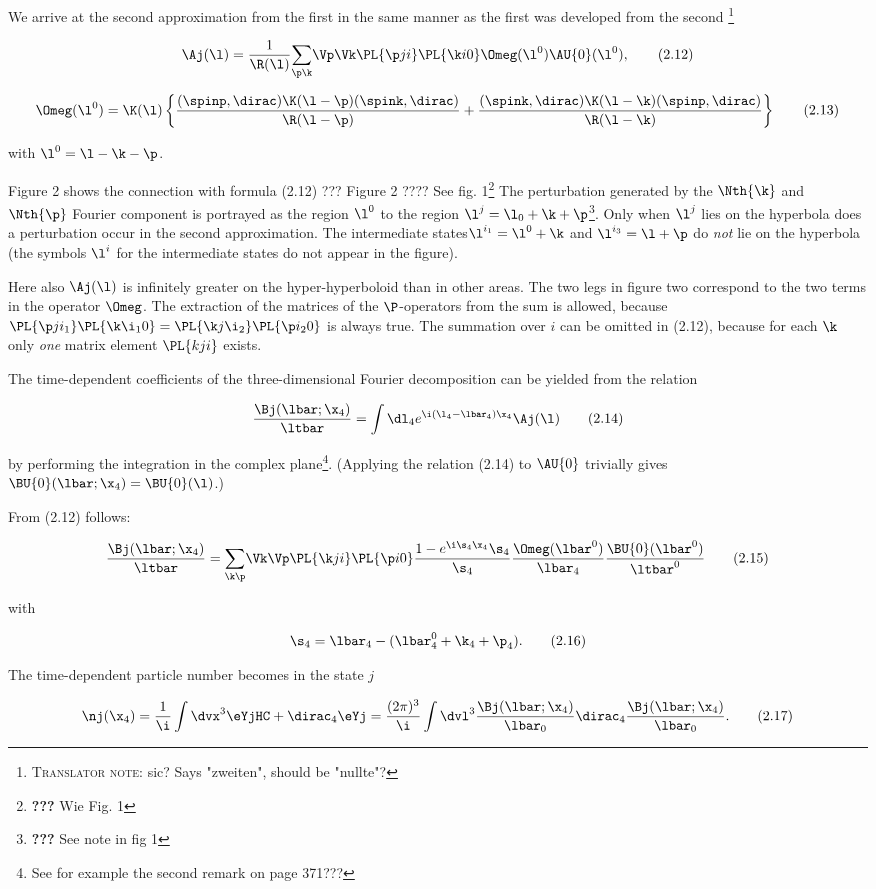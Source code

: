 \documentclass{article}
\newcommand{\WTF}[1]{\footnote{\textbf{???} #1}}
\newcommand{\nequ}[2]{
\begin{align*}
#1
\tag{#2}
\end{align*}
}
\newcommand{\TN}[1]{
\footnote{\sc{Translator note}: #1}
}
\newcommand{\const}[1]{#1}
\newcommand{\inv}[1]{\frac{1}{#1}}
\renewcommand{\it}[1]{\textit{#1}}
\renewcommand{\sc}[1]{\textsc{#1}}
\newcommand{\sumX}[1]{\underset{#1}{\sum}}
\renewcommand{\exp}[1]{\const{e}^{#1}}
\begin{document}
We arrive at the second approximation from the first in the same manner as the first was developed from the second\TN{sic? Says "zweiten", should be "nullte"?}
\nequ{
\Aj(\l) = \inv{\R(\l)}\sumX{\p\k}\Vp\Vk\PL{\p j i}\PL{\k i 0}\Omeg(\l^0)\AU{0}(\l^0),
}{2.12}
\nequ{
\Omeg(\l^0)=\K(\l)\left\{
\frac{(\spinp, \dirac)\K(\l-\p)(\spink, \dirac)}{\R(\l-\p)} + 
\frac{(\spink, \dirac)\K(\l-\k)(\spinp, \dirac)}{\R(\l-\k)}
\right\}
}{2.13}
with $\l^0=\l-\k-\p$.

Figure 2 shows the connection with formula (2.12)
??? Figure 2 ????
See fig. 1\WTF{Wie Fig. 1} The perturbation generated by the $\Nth{\k}$ and $\Nth{\p}$ Fourier component is portrayed as the region $\l^0$ to the region $\l^j=\l_0+\k+\p$\WTF{See note in fig 1}. Only when $\l^j$ lies on the hyperbola does a perturbation occur in the second approximation. The intermediate states$\l^{i_1} = \l^0 + \k$ and $\l^{i_3} = \l + \p$ do \it{not} lie on the hyperbola (the symbols $\l^i$ for the intermediate states do not appear in the figure).
 
Here also $\Aj(\l)$ is infinitely greater on the hyper-hyperboloid than in other areas. The two legs in figure two correspond to the two terms in the operator $\Omeg$. The extraction of the matrices of the $\P$-operators from the sum is allowed, because $\PL{\p j i_1}\PL{\k \i_1 0} = \PL{\k j \i_2}\PL{\p i_2 0}$ is always true. The summation over $i$ can be omitted in (2.12), because for each $\k$ only \it{one} matrix element $\PL{kji}$ exists.
 
The time-dependent coefficients of the three-dimensional Fourier decomposition can be yielded from the relation
\nequ{
\frac{\Bj(\lbar;\x_4)}{\ltbar}=\int\dl_{4}\exp{\i(\l_{4}-\lbar_{4})\x_4}\Aj(\l)
}{2.14}
by performing the integration in the complex plane\footnote{See for example the second remark on page 371???}. (Applying the relation (2.14) to $\AU{0}$ trivially gives $\BU{0}(\lbar;\x_{4})=\BU{0}(\l)$.)

From (2.12) follows:
\nequ{
\frac{\Bj(\lbar;\x_4)}{\ltbar} = \sumX{\k\p}\Vk\Vp\PL{\k j i}\PL{\p i 0}
\frac{1-\exp{\i\s_4\x_4}{\s_4}}{\s_4}\frac{\Omeg(\lbar^0)}{\lbar_4}\frac{\BU{0}(\lbar^0)}{\ltbar^0}
}{2.15}
with
\nequ{
\s_4=\lbar_4 - (\lbar^0_4 + \k_4 + \p_4).
}{2.16}

The time-dependent particle number becomes in the state $j$
\nequ{
\nj(\x_4) = \inv{\i}\int\dvx^3\eYjHC + \dirac_4\eYj
 = \frac{(2\pi)^3}{\i}\int\dvl^3\frac{\Bj(\lbar;\x_4)}{\lbar_0}\dirac_4\frac{\Bj(\lbar;\x_4)}{\lbar_0}.
}{2.17}
\end{document}
